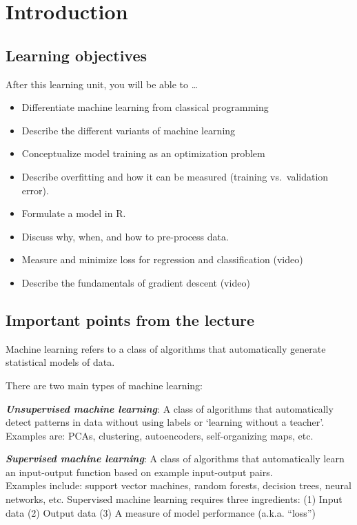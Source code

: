 \documentclass[
]{book}
\providecommand{\tightlist}{%
  \setlength{\itemsep}{0pt}\setlength{\parskip}{0pt}}
\begin{document}
\hypertarget{introduction-2}{%
\section{Introduction}\label{introduction-2}}

\hypertarget{learning-objectives-1}{%
\subsection{Learning objectives}\label{learning-objectives-1}}

After this learning unit, you will be able to \ldots{}

\begin{itemize}
\tightlist
\item
  Differentiate machine learning from classical programming
\item
  Describe the different variants of machine learning
\item
  Conceptualize model training as an optimization problem
\item
  Describe overfitting and how it can be measured (training vs.~validation error).
\item
  Formulate a model in R.
\item
  Discuss why, when, and how to pre-process data.
\item
  Measure and minimize loss for regression and classification (video)
\item
  Describe the fundamentals of gradient descent (video)
\end{itemize}

\hypertarget{important-points-from-the-lecture}{%
\subsection{Important points from the lecture}\label{important-points-from-the-lecture}}

Machine learning refers to a class of algorithms that automatically generate statistical models of data.

There are two main types of machine learning:

\textbf{\emph{Unsupervised machine learning}}:
A class of algorithms that automatically detect patterns in data without using labels or `learning without a teacher'.\\
Examples are: PCAs, clustering, autoencoders, self-organizing maps, etc.

\textbf{\emph{Supervised machine learning}}:
A class of algorithms that automatically learn an input-output function based on example input-output pairs.\\
Examples include: support vector machines, random forests, decision trees, neural networks, etc.
Supervised machine learning requires three ingredients:
(1) Input data (2) Output data (3) A measure of model performance (a.k.a. ``loss'')
\end{document}
